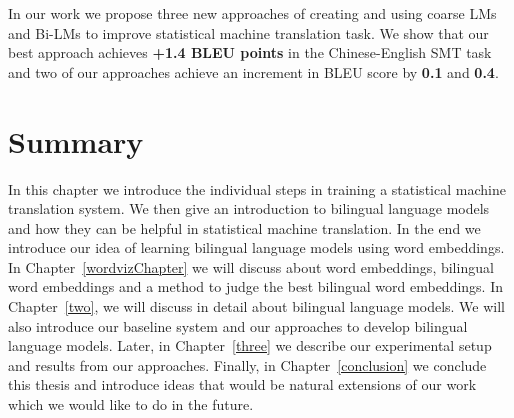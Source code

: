 In our work we propose three new approaches of creating and using coarse LMs and Bi-LMs to improve statistical machine translation task. We show that our best approach achieves \textbf{+1.4 BLEU points} in the Chinese-English SMT task and two of our approaches achieve an increment in BLEU score by \textbf{0.1} and \textbf{0.4}.

\section{Summary}
In this chapter we introduce the individual steps in training a statistical machine translation system. We then give an introduction to bilingual language models and how they can be helpful in statistical machine translation. In the end we introduce our idea of learning bilingual language models using word embeddings. In Chapter~\ref{wordvizChapter} we will discuss about word embeddings, bilingual word embeddings and a method to judge the best bilingual word embeddings. In Chapter~\ref{two}, we will discuss in detail about bilingual language models. We will also introduce our baseline system and our approaches to develop bilingual language models. Later, in Chapter~\ref{three} we describe our experimental setup and results from our approaches. Finally, in Chapter~\ref{conclusion} we conclude this thesis and introduce ideas that would be natural extensions of our work which we would like to do in the future.